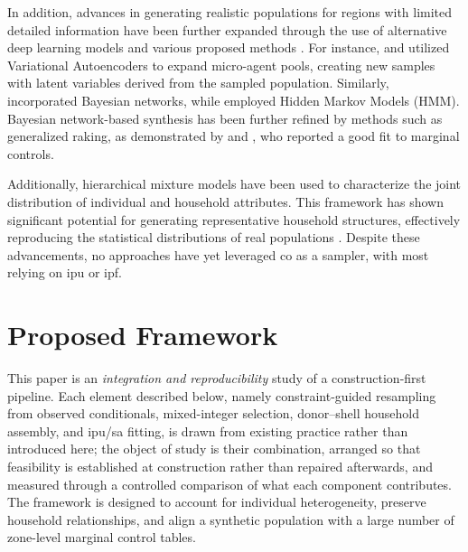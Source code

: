 ﻿\documentclass[../main.tex]{subfiles}
\begin{document}
 In addition, advances in generating realistic populations for regions with limited detailed information have been further expanded through the use of alternative deep learning models and various proposed methods \citep{Jutras-Dube2024Copula-basedGeneration}. For instance, \citet{Borysov2019HowSynthesis} and \citet{Aemmer2022GenerativeCharacteristics} utilized Variational Autoencoders to expand micro-agent pools, creating new samples with latent variables derived from the sampled population. Similarly, \citet{Ilahi2019IntegratingJakarta} incorporated Bayesian networks, while \citet{Saadi2018AnFusion} employed Hidden Markov Models (HMM). Bayesian network-based synthesis has been further refined by methods such as generalized raking, as demonstrated by \citet{Ilahi2019IntegratingJakarta} and \citet{Zhou2022CreatingMicrosimulation}, who reported a good fit to marginal controls.

Additionally, hierarchical mixture models have been used to characterize the joint distribution of individual and household attributes. This framework has shown significant potential for generating representative household structures, effectively reproducing the statistical distributions of real populations \citep{Sun2018ASynthesis}. Despite these advancements, no approaches have yet leveraged \gls{co} as a sampler, with most relying on \gls{ipu} or \gls{ipf}.

\section{Proposed Framework}

This paper is an \emph{integration and reproducibility} study of a construction-first pipeline. Each element described below, namely constraint-guided resampling from observed conditionals, mixed-integer selection, donor--shell household assembly, and \gls{ipu}/\gls{sa} fitting, is drawn from existing practice rather than introduced here; the object of study is their combination, arranged so that feasibility is established at construction rather than repaired afterwards, and measured through a controlled comparison of what each component contributes. The framework is designed to account for individual heterogeneity, preserve household relationships, and align a synthetic population with a large number of zone-level marginal control tables.
\end{document}
